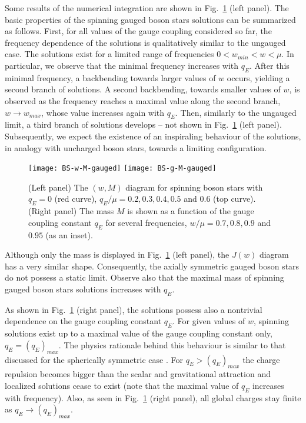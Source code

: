 Some results of the numerical integration are shown in Fig.~\ref{fig:w-M-gauged} (left panel).
The basic properties of the spinning gauged boson stars solutions can be summarized as follows.
First, for all values of the gauge coupling considered so far, 
the frequency dependence of the solutions is qualitatively similar to the ungauged case.
The solutions 
exist for a limited range of frequencies
$0<w_{min}<w<\mu$. 
In particular, we observe that the minimal frequency increases with $q_E$. 
After this minimal frequency, a backbending towards larger values of $w$ occurs, yielding a second branch of solutions. 
A second backbending, towards
smaller values of $w$,  is observed as the frequency reaches a maximal value along the second branch, $w\to w_{max}$, whose value increases again with $q_E$. 
Then, similarly to the ungauged limit, a third branch of solutions develops -- not shown in Fig.~\ref{fig:w-M-gauged} (left panel).
Subsequently, we expect the existence of an inspiraling behaviour of the solutions, 
in analogy with uncharged boson stars, towards a limiting configuration.  


\begin{figure}[H]
  \begin{center}
    \texttt{[image: BS-w-M-gauged]}
      \texttt{[image: BS-g-M-gauged]}
  \end{center}
  \caption{
	(Left panel)
	The $(w,M)$ diagram for spinning boson stars with $q_E=0$ (red curve), $q_E/\mu=0.2, 0.3, 0.4, 0.5$
	and $0.6$ (top curve).  
		(Right panel)
	The mass $M$ is shown as a function of the gauge coupling constant $q_E$
	for several frequencies, $w/\mu=0.7, 0.8, 0.9$ and $0.95$ (as an inset).	}
  \label{fig:w-M-gauged}
\end{figure}
Although only the mass is displayed in Fig.~\ref{fig:w-M-gauged} (left panel), the $J(w)$
diagram has a very similar shape.
Consequently,  the axially symmetric gauged boson stars do not possess
a static limit.  Observe also that the maximal mass of spinning gauged boson stars solutions increases with $q_E$.


As shown in Fig.~\ref{fig:w-M-gauged} (right panel), 
the solutions possess also a nontrivial dependence on 
the gauge coupling constant $q_E$.
For given values of $w$,
spinning solutions exist up to a maximal
value of the gauge coupling constant only, $q_E=(q_E)_{max}$.
The physics rationale behind this behaviour 
is similar to that discussed for the spherically symmetric case 
\cite{Jetzer:1989av,Pugliese:2013gsa}.
For $q_E>(q_E)_{max}$ the charge repulsion  becomes bigger than
  the scalar and gravitational attraction and localized solutions cease to exist  
(note that the maximal value of $q_E$
increases with frequency).
Also, as seen in Fig.~\ref{fig:w-M-gauged} (right panel),
all global charges stay finite as $q_E\to (q_E)_{max}$.
 

